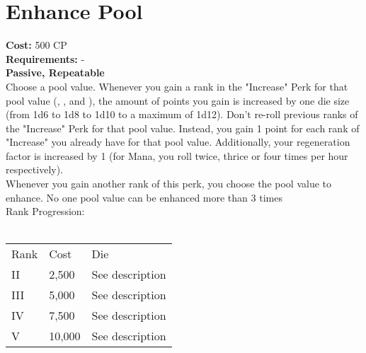 \section{Enhance Pool}\label{sec:enhancepool}
\textbf{Cost:} 500 CP\\
\textbf{Requirements:} -\\
\textbf{Passive, Repeatable}\\
Choose a pool value.
Whenever you gain a rank in the "Increase" Perk for that pool value (, , and ), the amount of points you gain is increased by one die size (from 1d6 to 1d8 to 1d10 to a maximum of 1d12).
Don't re-roll previous ranks of the "Increase" Perk for that pool value.
Instead, you gain 1 point for each rank of "Increase" you already have for that pool value.
Additionally, your regeneration factor is increased by 1 (for Mana, you roll twice, thrice or four times per hour respectively).\\
Whenever you gain another rank of this perk, you choose the pool value to enhance.
No one pool value can be enhanced more than 3 times
\\
Rank Progression:\\
\\
\begin{tabular}{l | l | p{12cm} }
    Rank & Cost & Die\\
    II & 2,500 & See description \\
    III & 5,000 & See description \\
    IV & 7,500 & See description\\
    V & 10,000 & See description\\
\end{tabular}